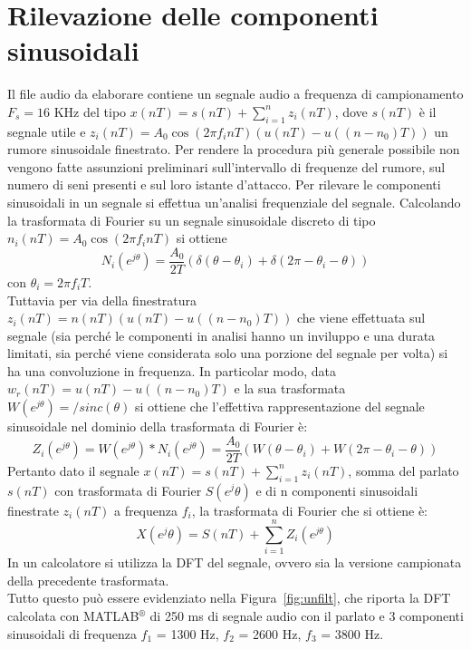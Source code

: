 \documentclass[10pt,A4]{article}
\begin{document}
\section{Rilevazione delle componenti sinusoidali}
Il file audio da elaborare contiene un segnale audio a frequenza di campionamento $F_s = 16$ KHz del tipo $x(nT) = s(nT) + \sum_{i=1}^{n} z_i(nT)$, dove $s(nT)$ è il segnale utile e $z_i(nT) = A_0 \cos(2 \pi f_i n T)(u(nT) - u((n - n_0)T))$ un rumore sinusoidale finestrato. Per rendere la procedura più generale possibile non vengono fatte assunzioni preliminari sull'intervallo di frequenze del rumore, sul numero di seni presenti e sul loro istante d'attacco.
Per rilevare le componenti sinusoidali in un segnale si effettua un'analisi frequenziale del segnale.
Calcolando la trasformata di Fourier su un segnale sinusoidale discreto di tipo $n_i(nT) = A_0 \cos(2 \pi f_i n T)$ si ottiene
\begin{equation}
  N_i(e^{j\theta}) = \frac{A_0}{2T}(\delta(\theta - \theta_i) + \delta(2 \pi - \theta_i - \theta))
\end{equation}
con $\theta_i = 2\pi f_i T$. \\
Tuttavia per via della finestratura $z_i(nT) = n(nT)(u(nT) - u((n - n_0)T))$ che viene effettuata sul segnale (sia perché le componenti in analisi hanno un inviluppo e una durata limitati, sia perché viene considerata solo una porzione del segnale per volta) si ha una convoluzione in frequenza. In particolar modo, data $w_r(nT) =  u(nT) - u((n - n_0)T)$ e la sua trasformata $W(e^{j\theta}) = /sinc(\theta) $ si ottiene che l'effettiva rappresentazione del segnale sinusoidale nel dominio della trasformata di Fourier è:
\begin{equation}
  Z_i(e^{j\theta}) = W(e^{j\theta}) * N_i(e^{j\theta}) = \frac{A_0}{2T}(W(\theta - \theta_i) + W(2 \pi - \theta_i - \theta))
\end{equation}
Pertanto dato il segnale $x(nT) = s(nT) + \sum_{i=1}^{n} z_i(nT)$, somma del parlato $s(nT)$ con trasformata di Fourier $S(e^j\theta)$ e di n componenti sinusoidali finestrate $z_i(nT)$ a frequenza $f_i$, la trasformata di Fourier che si ottiene è:
\begin{equation}
  X(e^j\theta) = S(nT) + \sum_{i=1}^{n} Z_i(e^{j\theta})
\end{equation}
In un calcolatore si utilizza la DFT del segnale, ovvero sia la versione campionata della precedente trasformata. \\
Tutto questo può essere evidenziato nella Figura~\ref{fig:unfilt}, che riporta la DFT calcolata con MATLAB$^{\circledR}$ di 250 ms di segnale audio con il parlato e 3 componenti sinusoidali di frequenza $f_1$ = 1300 Hz, $f_2$ = 2600 Hz, $f_3$ = 3800 Hz. \\
\end{document}
